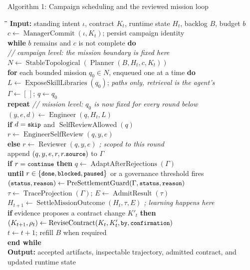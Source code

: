 \begin{paperbox}{Algorithm 1: Campaign scheduling and the reviewed mission loop}
\small
\begin{tabbing}
\quad\=\quad\=\quad\=\quad\=\kill
\textbf{Input:} standing intent $\iota$, contract $K_t$, runtime state $H_t$, backlog $B$, budget $b$ \\
$c \leftarrow \operatorname{ManagerCommit}(\iota,K_t)$; persist campaign identity \\
\textbf{while} $b$ remains and $c$ is not complete \textbf{do} \\
\> \textit{// campaign level: the mission boundary is fixed here} \\
\> $N \leftarrow \operatorname{StableTopological}(\operatorname{Planner}(B,H_t,c,K_t))$ \\
\> \textbf{for} each bounded mission $q_0 \in N$, enqueued one at a time \textbf{do} \\
\>\> $L \leftarrow \operatorname{ExposeSkillLibraries}(q_0)$; \textit{paths only, retrieval is the agent's} \\
\>\> $\Gamma \leftarrow [\,]$; $q \leftarrow q_0$ \\
\>\> \textbf{repeat} \textit{// mission level: $q_0$ is now fixed for every round below} \\
\>\>\> $(y,e,d) \leftarrow \operatorname{Engineer}(q,H_t,L)$ \\
\>\>\> \textbf{if} $d=\texttt{\small skip}$ and $\operatorname{SelfReviewAllowed}(q)$ \\
\>\>\>\> $r \leftarrow \operatorname{EngineerSelfReview}(q,y,e)$ \\
\>\>\> \textbf{else} $r \leftarrow \operatorname{Reviewer}(q,y,e)$ \textit{; scoped to this round} \\
\>\>\> append $(q,y,e,r,r.\texttt{\small source})$ to $\Gamma$ \\
\>\>\> \textbf{if} $r=\texttt{\small continue}$ \textbf{then} $q \leftarrow \operatorname{AdaptAfterRejections}(\Gamma)$ \\
\>\> \textbf{until} $r\in\{\texttt{\small done},\texttt{\small blocked},\texttt{\small paused}\}$ or a governance threshold fires \\
\>\> $(\texttt{\small status},\texttt{\small reason}) \leftarrow \operatorname{PreSettlementGuard}(\Gamma,\texttt{\small status},\texttt{\small reason})$ \\
\>\> $\tau \leftarrow \operatorname{TraceProjection}(\Gamma)$; \quad $E \leftarrow \operatorname{AdmitResult}(\tau)$ \\
\>\> $H_{t+1} \leftarrow \operatorname{SettleMissionOutcome}(H_t,\tau,E)$ \textit{; learning happens here} \\
\> \textbf{if} evidence proposes a contract change $K'_t$ \textbf{then} \\
\>\> $(K_{t+1},\rho_t) \leftarrow \operatorname{ReviseContract}(K_t,K'_t,\texttt{\small by},\texttt{\small confirmation})$ \\
\> $t \leftarrow t+1$; refill $B$ when required \\
\textbf{end while} \\
\textbf{Output:} accepted artifacts, inspectable trajectory, admitted contract, and updated runtime state
\end{tabbing}
\end{paperbox}

